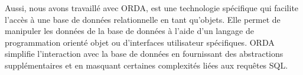 Aussi, nous avons travaillé avec ORDA, est une technologie spécifique qui facilite l’accès à une base de données relationnelle en tant qu’objets. Elle permet de manipuler les données de la base de données à l’aide d’un langage de programmation orienté objet ou d’interfaces utilisateur spécifiques. ORDA simplifie l’interaction avec la base de données en fournissant des abstractions supplémentaires et en masquant certaines complexités liées aux requêtes SQL.
\newline








